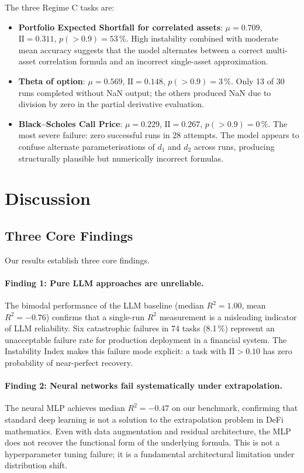 \documentclass[twoside,11pt]{article}
\newcommand{\Rsq}{R^{2}}
\newcommand{\II}{\mathrm{II}}
\begin{document}
The three Regime C tasks are:
\begin{itemize}
  \item \textbf{Portfolio Expected Shortfall for correlated assets}:
    $\mu=0.709$, $\II=0.311$, $p(>0.9)=53\,\%$.  High instability combined with
    moderate mean accuracy suggests that the model alternates between a correct
    multi-asset correlation formula and an incorrect single-asset approximation.
  \item \textbf{Theta of option}: $\mu=0.569$, $\II=0.148$, $p(>0.9)=3\,\%$.
    Only 13 of 30 runs completed without NaN output; the others produced NaN due
    to division by zero in the partial derivative evaluation.
  \item \textbf{Black--Scholes Call Price}: $\mu=0.229$, $\II=0.267$, $p(>0.9)=0\,\%$.
    The most severe failure: zero successful runs in 28 attempts.  The model
    appears to confuse alternate parameterisations of $d_1$ and $d_2$ across runs,
    producing structurally plausible but numerically incorrect formulas.
\end{itemize}

\section{Discussion}
\label{sec:discussion}

\subsection{Three Core Findings}
\label{sec:disc_findings}

Our results establish three core findings.

\paragraph{Finding 1: Pure LLM approaches are unreliable.}
The bimodal performance of the LLM baseline (median $\Rsq=1.00$, mean $\Rsq=-0.76$)
confirms that a single-run $\Rsq$ measurement is a misleading indicator of LLM
reliability.  Six catastrophic failures in 74 tasks (8.1\,\%) represent an
unacceptable failure rate for production deployment in a financial system.  The
Instability Index makes this failure mode explicit: a task with $\II>0.10$ has
zero probability of near-perfect recovery.

\paragraph{Finding 2: Neural networks fail systematically under extrapolation.}
The neural MLP achieves median $\Rsq=-0.47$ on our benchmark, confirming that
standard deep learning is not a solution to the extrapolation problem in DeFi
mathematics.  Even with data augmentation and residual architecture, the MLP does
not recover the functional form of the underlying formula.  This is not a
hyperparameter tuning failure; it is a fundamental architectural limitation under
distribution shift.
\end{document}
